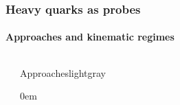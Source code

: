 \documentclass[aspectratio=169,11pt,usenames,dvipsnames]{beamer}
\begin{document}

\begin{frame}
    \frametitle{Heavy quarks as probes}
    \framesubtitle{Approaches and kinematic regimes}
    {
    \vspace{-5pt}
    \begin{columns}[onlytextwidth,t]
            \vspace{-20pt}
            \begin{center}
            \end{center}
        \vspace{10pt}
        \begin{center}
            \begin{custombox2transp}{\color{normal}Approaches}{lightgray}
                \small
                \begin{varwidth}{0.85\textwidth}
                \begin{itemize}\itemsep0em 

\end{itemize}
\end{varwidth}
\end{custombox2transp}
\end{center}
\end{columns}}
\end{frame}
\end{document}

